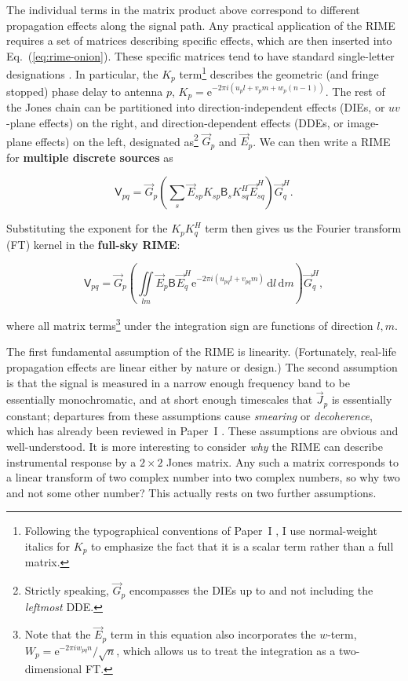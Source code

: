 \documentclass[]{aa}
\newcommand{\herm}{H}
\newcommand{\jones}[2]{\vec {#1}_{#2}}
\newcommand{\jonesT}[2]{\vec {#1}^{\herm}_{#2}}
\newcommand{\coh}[2]{\mathsf{{#1}}_{{#2}}}
\newcommand{\Exp}[1]{\mathrm{e}^{#1}}
\newcommand{\DD}[1]{\,\mathrm{d}{#1}}
\begin{document}
The individual terms in the matrix product above correspond to different propagation effects along the signal path. Any practical application of the RIME 
requires a set of matrices describing specific effects, which are then inserted into Eq.~(\ref{eq:rime-onion}). These specific matrices tend to have standard single-letter designations \citep[see e.g.][Sect.~7.3]{meqtrees}. In particular, the $K_p$ term\footnote{Following the typographical conventions of Paper~I \citep[][Sect.~1.4]{RRIME1}, I use normal-weight italics for $K_p$ to emphasize the fact that it is a scalar term rather than a full matrix.} describes the geometric (and fringe stopped) phase delay to antenna $p$,  $K_p = \Exp{-2\pi i(u_p l+v_p m+w_p (n-1))}.$ The rest of the Jones chain can be partitioned into direction-independent effects (DIEs, or $uv$-plane effects) on the right, and direction-dependent effects (DDEs, or image-plane effects) on the left, designated as\footnote{Strictly speaking, $\jones{G}{p}$ encompasses the DIEs up to and not including the \emph{leftmost} DDE.} $\jones{G}{p}$ and $\jones{E}{p}$. We can then write a RIME for {\bf multiple discrete sources} as

\begin{equation}
  \label{eq:rime-nps}
  \coh{V}{pq} = \jones{G}{p} \left ( \sum_{s}{\jones{E}{sp} K_{sp} \coh{B}{s} K^\herm_{sq} \jonesT{E}{sq}} \right ) \jonesT{G}{q}.
\end{equation}

Substituting the exponent for the $K_pK_q^\herm$ term then gives us the Fourier transform (FT) kernel in the {\bf full-sky RIME}:

\begin{equation}
  \label{eq:rime-fullsky}
  \coh{V}{pq} = \jones{G}{p} \left( \iint\limits_{lm} \jones{E}{p} \coh{B}{} \jonesT{E}{q} \Exp{-2\pi i(u_{pq} l+v_{pq} m)} \DD{l}\DD{m} \right ) \jonesT{G}{q},
\end{equation}

where all matrix terms\footnote{Note that the $\jones{E}{p}$ term in this equation also incorporates the $w$-term, $W_p=\Exp{-2\pi iw_{pq}n}/\sqrt{n}$,
which allows us to treat the integration as a two-dimensional FT.} under the integration sign are functions of direction $l,m$.

The first fundamental assumption of the RIME is linearity. (Fortunately, real-life propagation effects are linear either by nature or design.) The second assumption is that the signal is measured in a narrow enough frequency band to be essentially monochromatic, and at short enough timescales that $\jones{J}{p}$ is essentially constant; departures from these assumptions cause \emph{smearing} or \emph{decoherence}, which has already been reviewed in Paper~I \citep[][Sect.~5.2]{RRIME1}. These assumptions are obvious and well-understood. It is more interesting to consider \emph{why\/} the RIME can describe instrumental response by a $2\times2$ Jones matrix. Any such a matrix corresponds to a linear transform of two complex number into two complex numbers, so why two and not some other number? This actually rests on two further assumptions.
\end{document}
